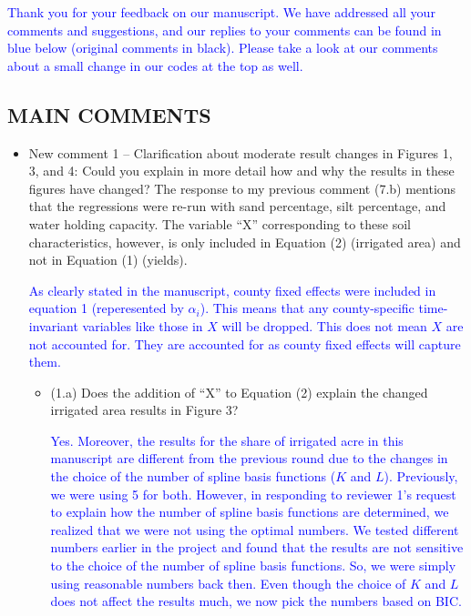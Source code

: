 \documentclass[
]{article}
\begin{document}
\textcolor{blue}{Thank you for your feedback on our manuscript. We have addressed all your comments and suggestions, and our replies to your comments can be found in blue below (original comments in black). Please take a look at our comments about a small change in our codes at the top as well.}

\subsection{MAIN COMMENTS}

\begin{itemize}
\item New comment 1 – Clarification about moderate result changes in Figures 1, 3, and 4: Could you explain in more detail how and why the results in these figures have changed? The response to my previous comment (7.b) mentions that the regressions were re-run with sand percentage, silt percentage, and water holding capacity. The variable ``X'' corresponding to these soil characteristics, however, is only included in Equation (2) (irrigated area) and not in Equation (1) (yields).

  \textcolor{blue}{As clearly stated in the manuscript, county fixed effects were included in equation 1 (reperesented by $\alpha_i$). This means that any county-specific time-invariant variables like those in $X$ will be dropped. This does not mean $X$ are not accounted for. They are accounted for as county fixed effects will capture them.}

  \begin{itemize}
  \item (1.a) Does the addition of ``X'' to Equation (2) explain the changed irrigated area results in Figure 3?

  \textcolor{blue}{Yes. Moreover, the results for the share of irrigated acre in this manuscript are different from the previous round due to the changes in the choice of the number of spline basis functions ($K$ and $L$). Previously, we were using 5 for both. However, in responding to reviewer 1's request to explain how the number of spline basis functions are determined, we realized that we were not using the optimal numbers. We tested different numbers earlier in the project and found that the results are not sensitive to the choice of the number of spline basis functions. So, we were simply using reasonable numbers back then. Even though the choice of $K$ and $L$ does not affect the results much, we now pick the numbers based on BIC.}
  

\end{itemize}
\end{itemize}
\end{document}

